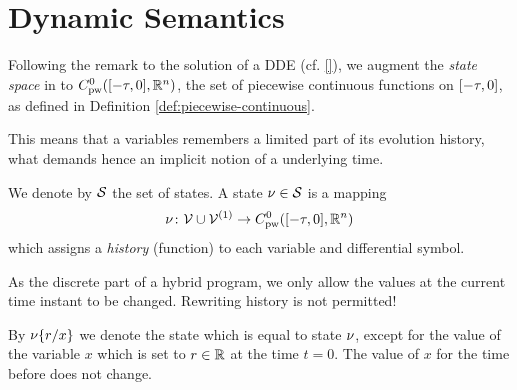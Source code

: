 \section{Dynamic Semantics}
    \label{sec:dynamic-semantics}

    Following the remark to the solution of a DDE (cf. \ref{}), we augment the \emph{state space} in \dL to $\statespace$, the set of piecewise continuous functions on $\delayinterval$, as defined in Definition \ref{def:piecewise-continuous}.

    This means that a variables remembers a limited part of its evolution history, what demands hence an implicit notion of a underlying time.

    We denote by $\states$ the set of states. A state $\asstate\in\states$ is a mapping
    \begin{equation}
        \asstate \from \allvars\cup\diffvars \to \statespace
    \end{equation}
    which assigns a \emph{history} (function) to each variable and differential symbol.

    As the discrete part of a hybrid program, we only allow the values at the current time instant to be changed. Rewriting history is not permitted!

    By $\modif{\asstate}{x}{r}$ we denote the state which is equal to state $\asstate$, except for the value of the variable $x$ which is set to $r\in\R$ at the time $t=0$. The value of $x$ for the time before does not change.


